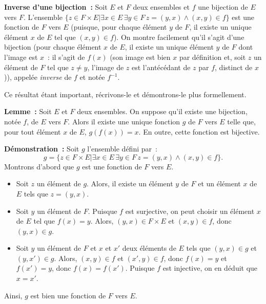 \noindent\textbf{Inverse d'une bijection :} Soit $E$ et $F$ deux ensembles et $f$ une bijection de $E$ vers $F$. 
    L'ensemble $\lbrace z \in F \times E \vert \exists x \in E \, \exists y \in F \, z = (y,x) \wedge (x,y) \in f \rbrace$ est une fonction de $F$ vers $E$ (puisque, pour chaque élément $y$ de $F$, il existe un unique élément $x$ de $E$ tel que $(x,y) \in f$). On montre facilement qu'il s'agit d'une bijection (pour chaque élément $x$ de $E$, il existe un unique élément $y$ de $F$ dont l'image est $x$ : il s'agit de $f(x)$ (son image est bien $x$ par définition et, soit $z$ un élément de $F$ tel que $z \neq y$, l'image de $z$ est l'antécédant de $z$ par $f$, distinct de $x$)), appelée \textit{inverse} de $f$ et notée $f^{-1}$.  

Ce résultat étant important, récrivons-le et démontrons-le plus formellement. 

\medskip

\noindent\textbf{Lemme :} Soit $E$ et $F$ deux ensembles. On suppose qu'il existe une bijection, notée $f$, de $E$ vers $F$. Alors il existe une unique fonction $g$ de $F$ vers $E$ telle que, pour tout élément $x$ de $E$, $g(f(x)) = x$. 
En outre, cette fonction est bijective. 

\medskip

\noindent\textbf{Démonstration :}
    Soit $g$ l'ensemble défini par : 
    \begin{equation*}
        g = \lbrace z \in F \times E \vert \exists x \in E \, \exists y \in F \, z = (y,x) \wedge (x,y) \in f \rbrace.
    \end{equation*}
    Montrons d'abord que $g$ est une fonction de $F$ vers $E$. 
    \begin{itemize}[nosep]
        \item Soit $z$ un élément de $g$. Alors, il existe un élément $y$ de $F$ et un élément $x$ de $E$ tels que $z = (y,x)$.
        \item Soit $y$ un élément de $F$. Puisque $f$ est surjective, on peut choisir un élément $x$ de $E$ tel que $f(x) = y$. 
            Alors, $(y,x) \in F \times E$ et $(x,y) \in f$, donc $(y,x) \in g$. 
        \item Soit $y$ un élément de $F$ et $x$ et $x'$ deux éléments de $E$ tels que $(y,x) \in g$ et $(y,x') \in g$.
            Alors, $(x,y) \in f$ et $(x',y) \in f$, donc $f(x) = y$ et $f(x') = y$, donc $f(x) = f(x')$.
            Puisque $f$ est injective, on en déduit que $x = x'$.
    \end{itemize}
    Ainsi, $g$ est bien une fonction de $F$ vers $E$.

